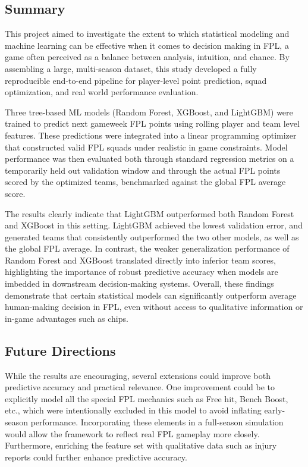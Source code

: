 \documentclass[11pt,a4paper]{article}
\begin{document}
\subsection{Summary}
This project aimed to investigate the extent to which statistical modeling and machine learning can be effective when it comes to decision making in FPL, a game often perceived as a balance between analysis, intuition, and chance. By assembling a large, multi-season dataset, this study developed a fully reproducible end-to-end pipeline for player-level point prediction, squad optimization, and real world performance evaluation.

Three tree-based ML models (Random Forest, XGBoost, and LightGBM) were trained to predict next gameweek FPL points using rolling player and team level features. These predictions were integrated into a linear programming optimizer that constructed valid FPL squads under realistic in game constraints. Model performance was then evaluated both through standard regression metrics on a temporarily held out validation window and through the actual FPL points scored by the optimized teams, benchmarked against the global FPL average score. 

The results clearly indicate that LightGBM outperformed both Random Forest and XGBoost in this setting. LightGBM achieved the lowest validation error, and generated teams that consistently outperformed the two other models, as well as the global FPL average. In contrast, the weaker generalization performance of Random Forest and XGBoost translated directly into inferior team scores, highlighting the importance of robust predictive accuracy when models are imbedded in downstream decision-making systems. Overall, these findings demonstrate that certain statistical models can significantly outperform average human-making decision in FPL, even without access to qualitative information or in-game advantages such as chips. 


\subsection{Future Directions}
While the results are encouraging, several extensions could improve both predictive accuracy and practical relevance. One improvement could be to explicitly model all the special FPL mechanics such as Free hit, Bench Boost, etc., which were intentionally excluded in this model to avoid inflating early-season performance. Incorporating these elements in a full-season simulation would allow the framework to reflect real FPL gameplay more closely. Furthermore, enriching the feature set with qualitative data such as injury reports could further enhance predictive accuracy. 
\end{document}
